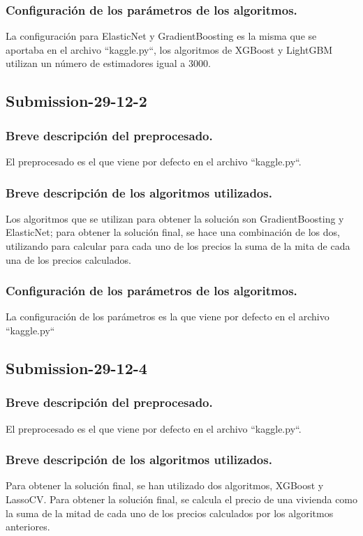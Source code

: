 	\subsubsection{Configuración de los parámetros de los algoritmos.}
	La configuración para ElasticNet y GradientBoosting es la misma que se aportaba en el archivo ``kaggle.py``, los algoritmos de XGBoost y LightGBM utilizan un número de estimadores igual a 3000.
	
	\subsection{Submission-29-12-2}
	\subsubsection{Breve descripción del preprocesado.}
	El preprocesado es el que viene por defecto en el archivo ``kaggle.py``.
	\subsubsection{Breve descripción de los algoritmos utilizados.}
	Los algoritmos que se utilizan para obtener la solución son GradientBoosting y ElasticNet; para obtener la solución final, se hace una combinación de los dos, utilizando para calcular para cada uno de los precios la suma de la mita de cada una de los precios calculados.
	\subsubsection{Configuración de los parámetros de los algoritmos.}
	La configuración de los parámetros es la que viene por defecto en el archivo ``kaggle.py``
	
	\subsection{Submission-29-12-4}
	\subsubsection{Breve descripción del preprocesado.}
	El preprocesado es el que viene por defecto en el archivo ``kaggle.py``.
	\subsubsection{Breve descripción de los algoritmos utilizados.}
	Para obtener la solución final, se han utilizado dos algoritmos, XGBoost y LassoCV. Para obtener la solución final, se calcula el precio de una vivienda como la suma de la mitad de cada uno de los precios calculados por los algoritmos anteriores.
